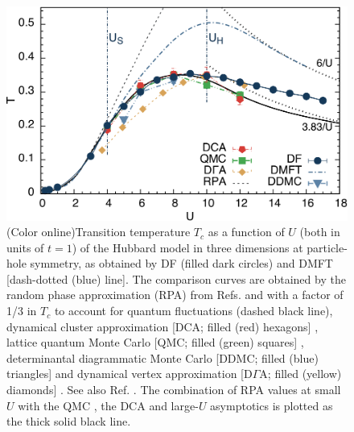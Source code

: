 \documentclass[aps,prb,twocolumn,amsmath,notitlepage,floatfix,footinbib,superscriptaddress,showpacs, showkeys]{revtex4-1}
\begin{document}
\begin{figure}[ht]
\begin{center}
\includegraphics[width=\columnwidth]{fig1.pdf}\end{center}\vspace*{-1.5em}
\caption{(Color online)Transition temperature $T_c$ as a function of $U$ (both in units of $t=1$) of the Hubbard model in three dimensions at particle-hole symmetry, as obtained by DF (filled dark circles) and  DMFT [dash-dotted (blue) line].
The comparison curves are obtained by the random phase approximation (RPA) from Refs.  and \cite{Scalettar1989} with a factor of 1/3 in $T_c$ to account for quantum fluctuations \cite{Freericks1994} (dashed black line), dynamical cluster approximation [DCA; filled (red) hexagons] \cite{Kent2005}, lattice quantum Monte Carlo [QMC; filled (green) squares]  \cite{Staudt2000}, determinantal diagrammatic Monte Carlo [DDMC; filled (blue) triangles] \cite{Kozik2013} and dynamical vertex approximation [D$\Gamma$A; filled (yellow) diamonds] \cite{Rohringer2011}. See also Ref. . 
The combination of RPA values at small $U$ with the QMC \cite{Staudt2000}, the DCA \cite{Maier2005} and large-$U$ asymptotics is plotted as the thick solid black line.}
\label{fig:tc}
\end{figure}
\end{document}

